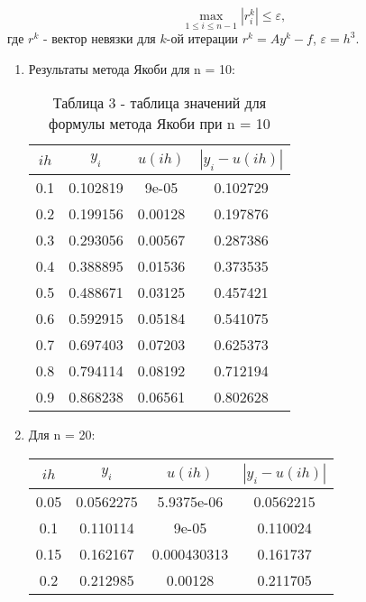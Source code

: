 \documentclass[a4paper,12pt]{article}
\begin{document}
\begin{equation*}
  \max_{1 \le i \le n - 1} \left|r_{i}^{k}\right| \le \varepsilon,
\end{equation*}
где $r^k$ - вектор невязки для $k$-ой итерации $r^k = Ay^k - f$, \hspace{0.5cm} $\varepsilon = h^3$.
\newpage
\begin{enumerate}[label = \arabic*.]
  \item {Результаты метода Якоби для n = 10:
    \begin{table}[h]
      \centering
      \begin{tabular}{|c|c|c|c|}
        \hline
        $ih$ & $y_i$ & $u(ih)$ & $\left|y_i-u(ih)\right|$\\ \hline
        0.1 &     0.102819 &        9e-05 &     0.102729\\ \hline
        0.2 &     0.199156 &      0.00128 &     0.197876\\ \hline
        0.3 &     0.293056 &      0.00567 &     0.287386\\ \hline
        0.4 &     0.388895 &      0.01536 &     0.373535\\ \hline
        0.5 &     0.488671 &      0.03125 &     0.457421\\ \hline
        0.6 &     0.592915 &      0.05184 &     0.541075\\ \hline
        0.7 &     0.697403 &      0.07203 &     0.625373\\ \hline
        0.8 &     0.794114 &      0.08192 &     0.712194\\ \hline
        0.9 &     0.868238 &      0.06561 &     0.802628\\ \hline
      \end{tabular}
      \caption*{\small{Таблица 3 - таблица значений для формулы метода Якоби при n = 10}}
    \end{table}
  }
  \item {Для n = 20:
    \begin{table}[h]
      \centering
      \begin{tabular}{|c|c|c|c|}
        \hline
        $ih$ & $y_i$ & $u(ih)$ & $\left|y_i-u(ih)\right|$\\ \hline
        0.05 &    0.0562275 &   5.9375e-06 &    0.0562215\\ \hline
        0.1 &     0.110114 &        9e-05 &     0.110024\\ \hline
        0.15 &     0.162167 &  0.000430313 &     0.161737\\ \hline
        0.2 &     0.212985 &      0.00128 &     0.211705\\ \hline

\end{tabular}
\end{table}}
\end{enumerate}
\end{document}
